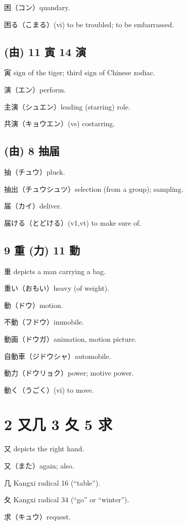 困（コン）quandary.

困る（こまる）(vi) to be troubled; to be embarrassed.

\subsection{(由) 11 寅 14 演}

寅 sign of the tiger; third sign of Chinese zodiac.

演（エン）perform.

主演（シュエン）leading (starring) role.

共演（キョウエン）(vs) costarring.

\subsection{(由) 8 抽届}

抽（チュウ）pluck.

抽出（チュウシュツ）selection (from a group); sampling.

届（カイ）deliver.

届ける（とどける）(v1,vt) to make sure of.

\subsection{9 重 (力) 11 動}

重 depicts a man carrying a bag.

重い（おもい）heavy (of weight).

動（ドウ）motion.

不動（フドウ）immobile.

動画（ドウガ）animation, motion picture.

自動車（ジドウシャ）automobile.

動力（ドウリョク）power; motive power.

動く（うごく）(vi) to move.

\section{2 又几 3 夂 5 求}

又 depicts the right hand.

又（また）again; also.

几 Kangxi radical 16 (``table'').

夂 Kangxi radical 34 (``go'' or ``winter'').

求（キュウ）request.

